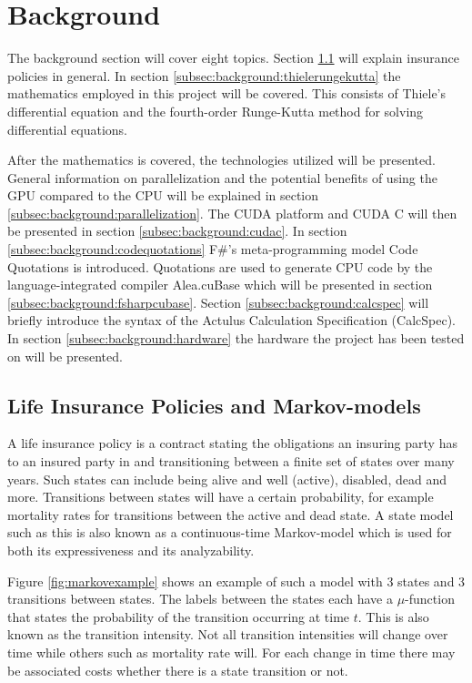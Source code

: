 \section{Background}
The background section will cover eight topics.
Section \ref{subsec:background:lifeinsurance} will explain insurance policies in general.
In section \ref{subsec:background:thielerungekutta} the mathematics employed in this project will be covered. 
This consists of Thiele's differential equation and the fourth-order Runge-Kutta method for solving differential equations.

After the mathematics is covered, the technologies utilized will be presented.
General information on parallelization and the potential benefits of using the GPU compared to the CPU will be explained in section \ref{subsec:background:parallelization}.
The CUDA platform and CUDA C will then be presented in section \ref{subsec:background:cudac}.
In section \ref{subsec:background:codequotations} F\#'s meta-programming model Code Quotations is introduced.
Quotations are used to generate CPU code by the language-integrated compiler Alea.cuBase which will be presented in section \ref{subsec:background:fsharpcubase}.
Section \ref{subsec:background:calcspec} will briefly introduce the syntax of the Actulus Calculation Specification (CalcSpec).
In section \ref{subsec:background:hardware} the hardware the project has been tested on will be presented.

\subsection{Life Insurance Policies and Markov-models}\label{subsec:background:lifeinsurance}
A life insurance policy is a contract stating the obligations an insuring party has to an insured party in and transitioning between a finite set of states over many years.
Such states can include being alive and well (active), disabled, dead and more.
Transitions between states will have a certain probability, for example mortality rates for transitions between the active and dead state.
A state model such as this is also known as a continuous-time Markov-model which is used for both its expressiveness and its analyzability.

Figure \ref{fig:markovexample} shows an example of such a model with 3 states and 3 transitions between states. 
The labels between the states each have a $\mu$-function that states the probability of the transition occurring at time $t$. 
This is also known as the transition intensity.
Not all transition intensities will change over time while others such as mortality rate will.
For each change in time there may be associated costs whether there is a state transition or not.

